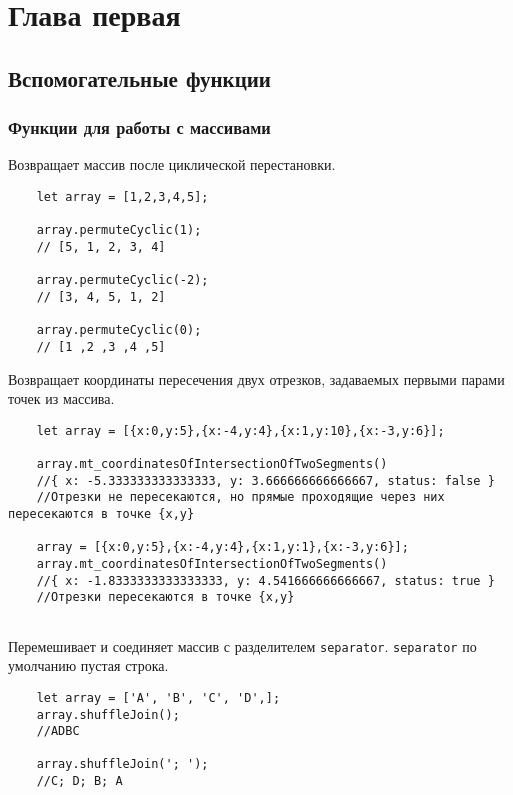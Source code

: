 
\section{Глава первая}
\subsection{Вспомогательные функции}
\subsubsection{Функции для работы с массивами}
Возвращает массив после циклической перестановки.

\begin{lstlisting}
    let array = [1,2,3,4,5];

    array.permuteCyclic(1);
    // [5, 1, 2, 3, 4]

    array.permuteCyclic(-2);
    // [3, 4, 5, 1, 2]

    array.permuteCyclic(0);
    // [1 ,2 ,3 ,4 ,5]
    \end{lstlisting}

Возвращает координаты пересечения двух отрезков, задаваемых первыми парами точек из массива.

\begin{lstlisting}
    let array = [{x:0,y:5},{x:-4,y:4},{x:1,y:10},{x:-3,y:6}];

    array.mt_coordinatesOfIntersectionOfTwoSegments()
    //{ x: -5.333333333333333, y: 3.666666666666667, status: false }
    //Отрезки не пересекаются, но прямые проходящие через них пересекаются в точке {x,y}

    array = [{x:0,y:5},{x:-4,y:4},{x:1,y:1},{x:-3,y:6}];
    array.mt_coordinatesOfIntersectionOfTwoSegments()
    //{ x: -1.8333333333333333, y: 4.541666666666667, status: true }
    //Отрезки пересекаются в точке {x,y}
        
\end{lstlisting}

Перемешивает и соединяет массив с разделителем \texttt{separator}. \texttt{separator} по умолчанию пустая строка.

\begin{lstlisting}
    let array = ['A', 'B', 'C', 'D',];
    array.shuffleJoin();
    //ADBC

    array.shuffleJoin('; ');
    //C; D; B; A 
\end{lstlisting}

